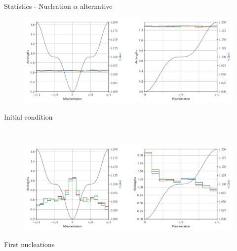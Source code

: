 \documentclass[usenames,dvipsnames]{beamer}
\begin{document}
\begin{frame}{Statistics - Nucleation $\alpha$ alternative}
\small
    \begin{minipage}{\textwidth}
    \centering
    \vspace{-0.5em}
    \begin{figure}
    \centering
    \includegraphics[scale=0.33]{figures/stored_energy/SE/gbcd/000000_nuclalternative_set.pdf}
    \end{figure}
    \vspace{-2em}
    Initial condition
    \end{minipage}\\
    \begin{minipage}{\textwidth}
    \centering
    \begin{figure}
    \centering
    \includegraphics[scale=0.33]{figures/stored_energy/SE/gbcd/000070_nuclalternative_set.pdf}
    \end{figure}
    \vspace{-2em}
    First nucleations
    \end{minipage}
\end{frame}
\end{document}
